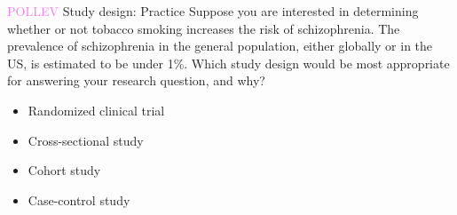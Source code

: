 \documentclass[10pt,t]{beamer}
\begin{document}
%

\begin{frame}{\textcolor{violet}{POLLEV} Study design: Practice}
Suppose you are interested in determining whether or not tobacco smoking increases the risk of schizophrenia. The prevalence of schizophrenia in the general population, either globally or in the US, is estimated to be under 1\%. Which study design would be most appropriate for answering your research question, and why?
\bigskip

\begin{itemize}
	\item Randomized clinical trial
	\item Cross-sectional study
	\item Cohort study
	\item Case-control study
\end{itemize}
\end{frame}
\end{document}
